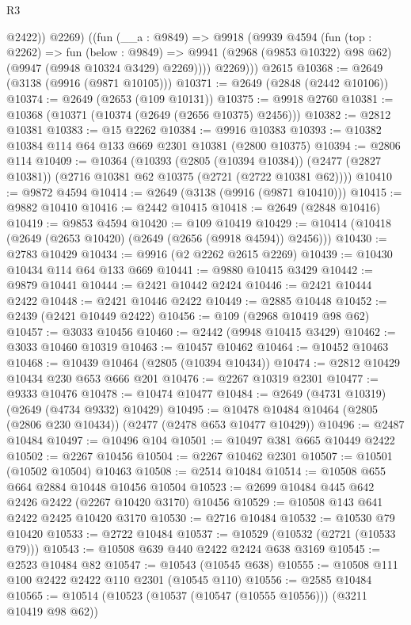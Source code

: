 \begin{lexlean}{R3}
\begin{coremodule}
            @2422))
          @2269)
        ((fun (__a : @9849) =>
        @9918
          (@9939
            @4594
            (fun (top : @2262) =>
            fun (below : @9849) =>
            @9941 (@2968 (@9853 @10322) @98 @62) (@9947 (@9948 @10324 @3429) @2269))))
          @2269)))
    @2615
@10368 := @2649 (@3138 (@9916 (@9871 @10105)))
@10371 := @2649 (@2848 (@2442 @10106))
@10374 := @2649 (@2653 (@109 @10131))
@10375 := @9918 @2760
@10381 := @10368 (@10371 (@10374 (@2649 (@2656 @10375) @2456)))
@10382 := @2812 @10381
@10383 := @15 @2262
@10384 := @9916 @10383
@10393 := @10382 @10384 @114 @64 @133 @669 @2301 @10381 (@2800 @10375)
@10394 := @2806 @114
@10409 := @10364
    (@10393
      (@2805 (@10394 @10384))
      (@2477 (@2827 @10381))
      (@2716 @10381 @62 @10375 (@2721 (@2722 @10381 @62))))
@10410 := @9872 @4594
@10414 := @2649 (@3138 (@9916 (@9871 @10410)))
@10415 := @9882 @10410
@10416 := @2442 @10415
@10418 := @2649 (@2848 @10416)
@10419 := @9853 @4594
@10420 := @109 @10419
@10429 := @10414 (@10418 (@2649 (@2653 @10420) (@2649 (@2656 (@9918 @4594)) @2456)))
@10430 := @2783 @10429
@10434 := @9916 (@2 @2262 @2615 @2269)
@10439 := @10430 @10434 @114 @64 @133 @669
@10441 := @9880 @10415 @3429
@10442 := @9879 @10441
@10444 := @2421 @10442 @2424
@10446 := @2421 @10444 @2422
@10448 := @2421 @10446 @2422
@10449 := @2885 @10448
@10452 := @2439 (@2421 @10449 @2422)
@10456 := @109 (@2968 @10419 @98 @62)
@10457 := @3033 @10456
@10460 := @2442 (@9948 @10415 @3429)
@10462 := @3033 @10460 @10319
@10463 := @10457 @10462
@10464 := @10452 @10463
@10468 := @10439 @10464 (@2805 (@10394 @10434))
@10474 := @2812 @10429 @10434 @230 @653 @666 @201
@10476 := @2267 @10319 @2301
@10477 := @9333 @10476
@10478 := @10474 @10477
@10484 := @2649 (@4731 @10319) (@2649 (@4734 @9332) @10429)
@10495 := @10478 @10484 @10464 (@2805 (@2806 @230 @10434)) (@2477 (@2478 @653 @10477 @10429))
@10496 := @2487 @10484
@10497 := @10496 @104
@10501 := @10497 @381 @665 @10449 @2422
@10502 := @2267 @10456
@10504 := @2267 @10462 @2301
@10507 := @10501 (@10502 @10504) @10463
@10508 := @2514 @10484
@10514 := @10508 @655 @664 @2884 @10448 @10456 @10504
@10523 := @2699 @10484 @445 @642 @2426 @2422 (@2267 @10420 @3170) @10456
@10529 := @10508 @143 @641 @2422 @2425 @10420 @3170
@10530 := @2716 @10484
@10532 := @10530 @79 @10420
@10533 := @2722 @10484
@10537 := @10529 (@10532 (@2721 (@10533 @79)))
@10543 := @10508 @639 @440 @2422 @2424 @638 @3169
@10545 := @2523 @10484 @82
@10547 := @10543 (@10545 @638)
@10555 := @10508 @111 @100 @2422 @2422 @110 @2301 (@10545 @110)
@10556 := @2585 @10484
@10565 := @10514 (@10523 (@10537 (@10547 (@10555 @10556))) (@3211 @10419 @98 @62))

\end{coremodule}
\end{lexlean}
